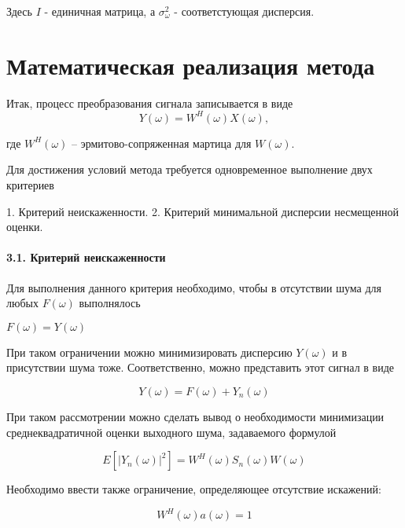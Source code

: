 \documentclass{article}
\begin{document}
Здесь $I$ - единичная матрица, а $\sigma_{\omega}^{2}$ - соответстующая дисперсия.

\section{Математическая реализация метода}

Итак, процесс преобразования сигнала записывается в виде
\begin{equation}
Y(\omega) = W^H(\omega)X(\omega),
\end{equation}

где $W^{H}(\omega)$ -- эрмитово-сопряженная мартица для $W(\omega)$.

Для достижения условий метода требуется одновременное выполнение двух критериев

1. Критерий неискаженности. \cite{Brown62}
2. Критерий минимальной дисперсии несмещенной оценки. \cite{Levin64}

\paragraph{3.1. Критерий неискаженности\\}
Для выполнения данного критерия необходимо, чтобы в отсутствии шума для любых $F(\omega)$ выполнялось

\begin{center}
$F(\omega) = Y(\omega)$
\end{center}

При таком ограничении можно минимизировать дисперсию $Y(\omega)$ и в присутствии шума тоже. Соответственно, можно представить этот сигнал в виде

\begin{equation}
Y(\omega) = F(\omega) + Y_{n}(\omega)
\end{equation}

При таком рассмотрении можно сделать вывод о необходимости минимизации среднеквадратичной оценки выходного шума, задаваемого формулой

\begin{equation}
E[|Y_{n}(\omega)|^{2}] = W^{H}(\omega)S_{n}(\omega)W(\omega)
\end{equation}

Необходимо ввести также ограничение, определяющее отсутствие искажений:

\begin{equation}
W^{H}(\omega)a(\omega) = 1
\end{equation}
\end{document}
